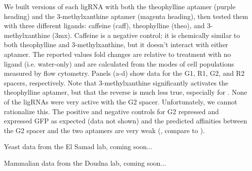 \documentclass[10pt,oneside]{article}
\begin{document}

    We built versions of each ligRNA with both the theophylline aptamer (purple heading) and the 3-methylxanthine aptamer (magenta heading), then tested them with three different ligands: caffeine (caff), theophylline (theo), and 3-methylxanthine (3mx).  Caffeine is a negative control; it is chemically similar to both theophylline and 3-methylxanthine, but it doesn't interact with either aptamer.  The reported values fold changes are relative to treatment with no ligand (i.e. water-only) and are calculated from the modes of cell populations measured by flow cytometry.  Panels (a-d) show data for the G1, R1, G2, and R2 spacers, respectively.  Note that 3-methylxanthine significantly activates the theophylline aptamer, but that the reverse is much less true, especially for \ligrnaB{}.  None of the ligRNAs were very active with the G2 spacer.  Unfortunately, we cannot rationalize this.  The positive and negative controls for G2 repressed and expressed GFP as expected (data not shown) and the predicted affinities between the G2 spacer and the two aptamers are very weak (, compare to ).


    Yeast data from the El Samad lab, coming soon...


    Mammalian data from the Doudna lab, coming soon...

\printbibliography[title=References]
\end{document}
